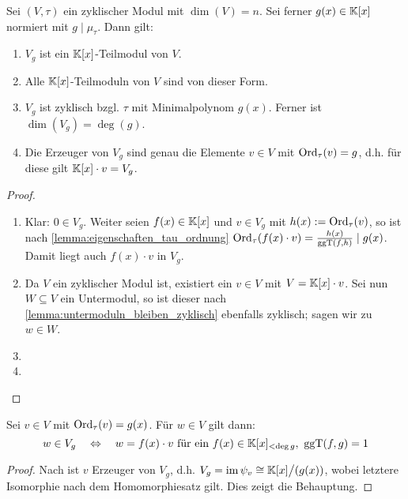 \begin{satz}
  \label{satz:moduln_ueber_v_g}
  Sei $(V,\tau)$ ein zyklischer Modul mit $\dim(V) = n$. Sei ferner 
  $g(x)\in \mathbb{K}[x]$ normiert mit $g\mid \mu_\tau$. Dann gilt:
  \begin{enumerate}
    \item $V_g$ ist ein $\mathbb{K}[x]$-Teilmodul von $V$.
    \item Alle $\mathbb{K}[x]$-Teilmoduln von $V$ sind von dieser Form.
    \item $V_g$ ist zyklisch bzgl. $\tau$ mit Minimalpolynom $g(x)$.
      Ferner ist $\dim(V_g) = \deg(g)$.
    \item Die Erzeuger von $V_g$ sind genau die Elemente $v\in V$ mit 
      $\operatorname{Ord}_\tau(v) = g$, d.h. für diese gilt
      $\mathbb{K}[x]\cdot v = V_g$.
  \end{enumerate}
\end{satz}
\begin{proof}
  \begin{enumerate}
    \item Klar: $0\in V_g$. Weiter seien $f(x) \in \mathbb{K}[x]$ und 
      $v \in V_g$ mit $h(x) := \operatorname{Ord}_\tau(v)$, 
      so ist nach \cref{lemma:eigenschaften_tau_ordnung}
      $\operatorname{Ord}_\tau(f(x)\cdot v) = \frac{h(x)}{\operatorname{ggT}(f,h)} \mid g(x)$.
      Damit liegt auch $f(x)\cdot v$ in $V_g$.
    \item Da $V$ ein zyklischer Modul ist, existiert ein $v\in V$ mit 
      $V = \mathbb{K}[x]\cdot v$. Sei nun $W\subseteq V$ ein Untermodul,
      so ist dieser nach \cref{lemma:untermoduln_bleiben_zyklisch} ebenfalls
      zyklisch; sagen wir zu $w \in W$. 

    \item
    \item
  \end{enumerate}
\end{proof}

\begin{kor}
  \label{kor:moduln_ueber_v_g}
  Sei $v \in V$ mit $\operatorname{Ord}_\tau(v) = g(x)$.
  Für $w \in V$ gilt dann:
  \[ w \in V_g \quad\Leftrightarrow\quad 
    w = f(x)\cdot v \text{ für ein } f(x) \in \K[x]_{< \deg g},\ \ggT(f,g)=1\]
\end{kor}
\begin{proof}
  Nach  ist $v$ Erzeuger von $V_g$, d.h.
  $V_g = \operatorname{im} \psi_v \cong \mathbb{K}[x]\big/(g(x))$, wobei letztere Isomorphie nach dem
  Homomorphiesatz gilt. Dies zeigt die Behauptung.
\end{proof}
